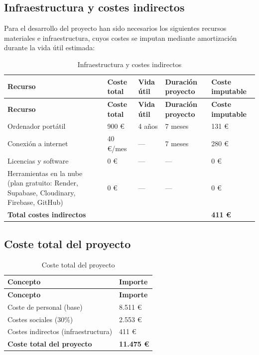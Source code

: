 \subsection{Infraestructura y costes indirectos}

Para el desarrollo del proyecto han sido necesarios los siguientes recursos materiales e infraestructura, cuyos costes se imputan mediante amortización durante la vida útil estimada:

\begin{longtable}{p{4.5cm}p{2.5cm}p{2cm}p{2.5cm}p{2.5cm}}
\caption{Infraestructura y costes indirectos}\label{tab:costes_indirectos}\\
\toprule
\textbf{Recurso} & \textbf{Coste total} & \textbf{Vida útil} & \textbf{Duración proyecto} & \textbf{Coste imputable} \\
\midrule
\endfirsthead
\toprule
\textbf{Recurso} & \textbf{Coste total} & \textbf{Vida útil} & \textbf{Duración proyecto} & \textbf{Coste imputable} \\
\midrule
\endhead
\bottomrule
\endlastfoot
Ordenador portátil & 900 € & 4 años & 7 meses & 131 € \\
Conexión a internet & 40 €/mes & — & 7 meses & 280 € \\
Licencias y software & 0 € & — & — & 0 € \\
Herramientas en la nube (plan gratuito: Render, Supabase, Cloudinary, Firebase, GitHub) & 0 € & — & — & 0 € \\
\midrule
\textbf{Total costes indirectos} & & & & \textbf{411 €} \\
\end{longtable}

\subsection{Coste total del proyecto}

\begin{longtable}{p{8cm}p{4cm}}
\caption{Coste total del proyecto}\label{tab:coste_total_proyecto}\\
\toprule
\textbf{Concepto} & \textbf{Importe} \\
\midrule
\endfirsthead
\toprule
\textbf{Concepto} & \textbf{Importe} \\
\midrule
\endhead
\bottomrule
\endlastfoot
Coste de personal (base) & 8.511 € \\
Costes sociales (30\%) & 2.553 € \\
Costes indirectos (infraestructura) & 411 € \\
\midrule
\textbf{Coste total del proyecto} & \textbf{11.475 €} \\
\end{longtable}


